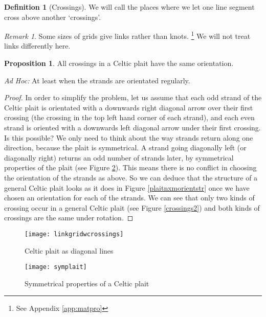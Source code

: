 \documentclass[10pt,a4paper]{report}
\theoremstyle{definition}
\newtheorem{definition}{Definition}[section]
\newtheorem{proposition}{Proposition}
\theoremstyle{remark}
\newtheorem*{remark}{Remark}
\theoremstyle{example}
\begin{document}
\begin{definition}[Crossings]

 We will call the places where we let one line segment cross above another `crossings'.
\end{definition}

\begin{remark}
 Some sizes of grids give links rather than knots. \footnote{ See Appendix \ref{app:matpro}} We will not treat links differently here.
 \end{remark}

\begin{proposition}
 All crossings in a Celtic plait have the same orientation.
 
 \emph{Ad Hoc:} At least when the strands are orientated regularly.
\end{proposition}
\begin{proof}
 In order to simplify the problem, let us assume that each odd strand of the Celtic plait is orientated with a downwards right diagonal arrow over their first crossing (the crossing in the top left hand corner of each strand), and each even strand is oriented with a downwards left diagonal arrow under their first crossing. Is this possible? We only need to think about the way strands return along one direction, because the plait is symmetrical. A strand going diagonally left (or diagonally right) returns an odd number of strands later, by symmetrical properties of the plait (see Figure \ref{symplait}). This means there is no conflict in choosing the orientation of the strands as above. So we can deduce that the structure of a general Celtic plait looks as it does in Figure \ref{plaitnxmorientstr} once we have chosen an orientation for each of the strands. 
We can see that only two kinds of crossing occur in a general Celtic plait (see Figure \ref{crossings2}) and both kinds of crossings are the same under rotation. 
\end{proof}

\begin{figure}[H]
\centering
\graphicspath{{/Users/Imogen/Desktop/seifertimages/lapath/}}
\texttt{[image: linkgridwcrossings]}
\caption{Celtic plait as diagonal lines}
\label{linkgridwcrossings}
\end{figure}

\begin{figure}[H]
\centering
\graphicspath{{/Users/Imogen/Desktop/seifertimages/lapath/}}
\texttt{[image: symplait]}
\caption{Symmetrical properties of a Celtic plait}
\label{symplait}
\end{figure}
\end{document}
